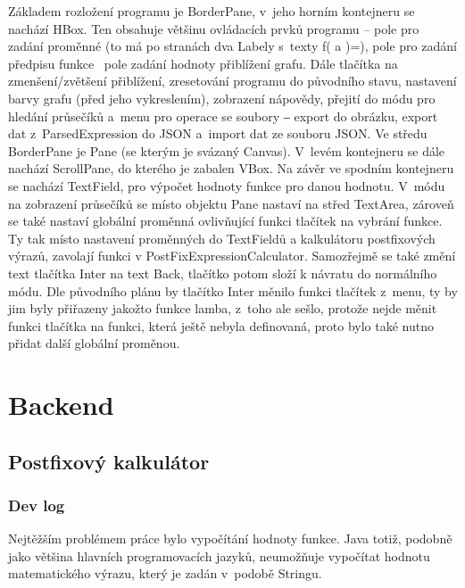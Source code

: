 \documentclass[a4paper,oneside,12p]{report}
\begin{document}
Základem rozložení programu je BorderPane, v~jeho horním kontejneru se nachází HBox.
Ten obsahuje většinu ovládacích prvků programu -- pole pro zadání proměnné (to má po stranách dva Labely s~texty f( a )=), pole pro zadání předpisu funkce ~pole zadání hodnoty přiblížení grafu.
Dále tlačítka na zmenšení/zvětšení přiblížení, zresetování programu do původního stavu, nastavení barvy grafu (před jeho vykreslením), zobrazení nápovědy, přejití do módu pro hledání průsečíků a~menu pro operace se soubory ‒ export do obrázku, export dat z~ParsedExpression do JSON a~import dat ze souboru JSON.
Ve středu BorderPane je Pane (se kterým je svázaný Canvas).
V~levém kontejneru se dále nachází ScrollPane, do kterého je zabalen VBox.
Na závěr ve spodním kontejneru se nachází TextField, pro výpočet hodnoty funkce pro danou hodnotu.
V~módu na zobrazení průsečíků se místo objektu Pane nastaví na střed TextArea, zároveň se také nastaví globální proměnná ovlivňující funkci tlačítek na vybrání funkce.
Ty tak místo nastavení proměnných do TextFieldů a kalkulátoru postfixových výrazů, zavolají funkci v PostFixExpressionCalculator.
Samozřejmě se také změní text tlačítka Inter na text Back, tlačítko potom složí k návratu do normálního módu.
Dle původního plánu by tlačítko Inter měnilo funkci tlačítek z~menu, ty by jim byly přiřazeny jakožto funkce lamba, z~toho ale sešlo, protože nejde měnit funkci tlačítka na funkci, která ještě nebyla definovaná, proto bylo také nutno přidat další globální proměnou.


\chapter{Backend}

\section{Postfixový kalkulátor}

\subsection{Dev log}

Nejtěžším problémem práce bylo vypočítání hodnoty funkce.
Java totiž, podobně jako většina hlavních programovacích jazyků, neumožňuje vypočítat hodnotu matematického výrazu, který je zadán v~podobě Stringu.
\end{document}
